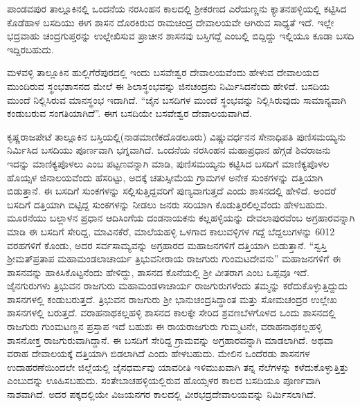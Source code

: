 ಪಾಂಡವಪುರ ತಾಲ್ಲೂಕಿನಲ್ಲಿ ಒಂದನೆಯ ನರಸಿಂಹನ ಕಾಲದಲ್ಲಿ ಶ‍್ರೀಕರಣದ ಎರೆಯಣ್ಣನು ಕ್ಯಾತನಹಳ್ಳಿಯಲ್ಲಿ ಕಟ್ಟಿಸಿದ ಕೊಡೆಹಾಳ ಬಸದಿಯು ಈಗ ಶಾಸನ ದೊರಕಿರುವ ರಾಮಚಂದ್ರ ದೇವಾಲಯವೇ ಆಗಿರುವ ಸಾಧ್ಯತೆ ಇದೆ. ಇಲ್ಲೇ ಭದ್ರವಾಹು ಚಂದ್ರಗುಪ್ತರನ್ನು ಉಲ್ಲೇಖಿಸುವ ಪ್ರಾಚೀನ ಶಾಸನವು ಬಸ್ತಿಗದ್ದೆ ಎಂಬಲ್ಲಿ ಬಿದ್ದಿದ್ದು ಇಲ್ಲಿಯೂ ಕೂಡಾ ಬಸದಿ ಇದ್ದಿರಬಹುದು.

ಮಳವಳ್ಳಿ ತಾಲ್ಲೂಕಿನ ಹುಲ್ಲಿಗೆರೆಪುರದಲ್ಲಿ ಇಂದು ಬಸವೇಶ್ವರ ದೇವಾಲಯವೆಂದು ಹೇಳುವ ದೇವಾಲಯದ ಮುಂದಿರುವ ಸ್ಥಂಭಶಾಸನದ ಮೇಲೆ ಈ ಶಿಲಾಸ್ಥಂಭವನ್ನು ಜಿನಚಂದ್ರನು ನಿರ್ಮಿಸಿದನೆಂದು ಹೇಳಿದೆ. ಬಸದಿಯ ಮುಂದೆ ನಿಲ್ಲಿಸಿರುವ ಮಾನಸ್ಥಂಭ ಇದಾಗಿದೆ. “ಜೈನ ಬಸದಿಗಳ ಮುಂದೆ ಸ್ಥಂಭವನ್ನು ನಿಲ್ಲಿಸಿರುವುದು ಸಾಮಾನ್ಯವಾಗಿ ಕಂಡುಬರುವ ಸಂಗತಿಯಾಗಿದೆ”. ಈಗ ಬಸದಿಯೇ ಬಸವೇಶ್ವರ ದೇವಾಲಯವಾಗಿದೆ.

ಕೃಷ್ಣರಾಜಪೇಟೆ ತಾಲ್ಲೂಕಿನ ಬಸ್ತಿಯಲ್ಲಿ(ನಾಡಮಾಣಿಕದೊಡಲೂರು) ವಿಷ್ಣುವರ್ಧನನ ಸೇನಾಧಿಪತಿ ಪುಣಿಸಮಯ್ಯನು ನಿರ್ಮಿಸಿದ ಬಸದಿಯು ಪೂರ್ಣವಾಗಿ ಭಗ್ನವಾಗಿದೆ. ಒಂದನೆಯ ನರಸಿಂಹನ ಮಹಾಪ್ರಧಾನ ಹೆಗ್ಗಡೆ ಶಿವರಾಜನು ಇದನ್ನು ಮಾಣಿಕ್ಯಪೊಳಲು ಎಂಬ ಪಟ್ಟಣವನ್ನಾಗಿ ಮಾಡಿ, ಪುಣಿಸಮಯ್ಯನು ಕಟ್ಟಿಸಿದ ಬಸದಿಗೆ ಮಾಣಿಕ್ಯಪೊಳಲ ಹೊಯ್ಸಳ ಜಿನಾಲಯವೆಂದು ಹೆಸರಿಟ್ಟು, ಅದಕ್ಕೆ ಚತುಸ್ಸೀಮೆಯ ಗ್ರಾಮಗಳ ಅನೇಕ ಸುಂಕಗಳನ್ನು ದತ್ತಿಯಾಗಿ ಬಿಡುತ್ತಾನೆ. ಈ ಬಸದಿಗೆ ಸುಂಕಗಳನ್ನು ಸಲ್ಲಿಸುತ್ತಿದ್ದವರಿಗೆ ಪುಣ್ಯವಾಗುತ್ತದೆ ಎಂದು ಶಾಸನದಲ್ಲಿ ಹೇಳಿದೆ. ಅಂದರೆ ಬಸದಿಗೆ ದತ್ತಿಯಾಗಿ ಬಿಟ್ಟಿದ್ದ ಸುಂಕಗಳನ್ನು ನೀಡಲು ಜನರು ಸರಿಯಾಗಿ ಕೊಡುತ್ತಿರಲಿಲ್ಲವೆಂದು ಹೇಳಬಹುದು. ಮೂರನೆಯು ಬಲ್ಲಾಳನ ಪ್ರಧಾನ ಆದಿಸಿಂಗೆಯ ದಂಡನಾಯಕನು ಕಲ್ಲಹಳ್ಳಿಯನ್ನು ದೇವಲಾಪುರವೆಂಬ ಅಗ್ರಹಾರವನ್ನಾಗಿ ಮಾಡಿ ಈ ಬಸದಿಗೆ ಸೇರಿದ್ದ, ಮಾವಿನಕೆರೆ, ಮಾಲೆಯಹಳ್ಳಿ ಒಳಗಾದ ಕಾಲುವಳ್ಳಿಗಳ ಗದ್ದೆ ಬೆದ್ದಲುಗಳನ್ನು 6012 ವರಹಗಳಿಗೆ ಕೊಂಡು, ಅದರ ಸರ್ವಸಾಮ್ಯವನ್ನು ಅಗ್ರಹಾರದ ಮಹಾಜನಗಳಿಗೆ ದತ್ತಿಯಾಗಿ ಬಿಡುತ್ತಾನೆ. “ಸ್ವಸ್ತಿ ಶ‍್ರೀಮತ್​ ಪ್ರತಾಪ ಮಹಾಮಂಡಲಾಚಾರ್ಯ ತ್ರಿಭುವನೀರಾಯ ರಾಜಗುರು ಗುಂಮಟದೇವನು” ಮಹಾಜನಗಳಿಗೆ ಈ ಶಾಸನವನ್ನು ಹಾಕಿಸಿಕೊಟ್ಟನೆಂದು ಹೇಳಿದ್ದು, ಶಾಸನದ ಕೊನೆಯಲ್ಲಿ ಶ‍್ರೀ ವೀತರಾಗ ಎಂಬ ಒಪ್ಪವೂ ಇದೆ. ಜೈನಗುರುಗಳು ತ್ರಿಭುವನ ರಾಜಗುರು ಮಹಾಮಂಡಳಾಚಾರ್ಯ ರಾಜಗುರುಗಳೆಂದು ತಮ್ಮನ್ನು ಕರೆದುಕೊಳ್ಳುತ್ತಿದ್ದುದು ಶಾಸನಗಳಲ್ಲಿ ಕಂಡುಬರುತ್ತದೆ. ತ್ರಿಭುವನ ರಾಜಗುರು ಶ‍್ರೀ ಭಾನುಚಂದ್ರಸಿದ್ಧಾಂತ ಮತ್ತು ಸೋಮಚಂದ್ರರ ಉಲ್ಲೇಖ ಶಾಸನಗಳಲ್ಲಿ ಬರುತ್ತದೆ. ವರಾಹನಾಥಕಲ್ಲಹಳ್ಳಿ ಶಾಸನದ ಕಾಲಕ್ಕೇ ಸೇರಿದ ಶ್ರವಣಬೆಳಗೊಳದ ಒಂದು ಶಾಸನದಲ್ಲಿ ರಾಜಗುರು ಗುಂಮಟಣ್ಣನ ಪ್ರಸ್ತಾಪ ಇದೆ ಬಹುಶಃ ಈ ರಾಯರಾಜಗುರು ಗುಮ್ಮಟನೇ, ವರಾಹನಾಥಕಲ್ಲಹಳ್ಳಿ ಶಾಸನೋಕ್ತ ರಾಜಗುರುವಾಗಿದ್ದಾನೆ. ಈ ಬಸದಿಗೆ ಸೇರಿದ್ದ ಗ್ರಾಮವನ್ನು ಅಗ್ರಹಾರವನ್ನಾಗಿ ಮಾಡಲಾಗಿದೆ. ಅಥವಾ ವರಾಹ ದೇವಾಲಯಕ್ಕೆ ದತ್ತಿಯಾಗಿ ಬಿಡಲಾಗಿದೆ ಎಂದು ಹೇಳಬಹುದು. ಮೇಲಿನ ಒಂದೆರಡು ಶಾಸನಗಳ ಉದಾಹರಣೆಯಿಂದಲೇ ಜಿಲ್ಲೆಯಲ್ಲಿ ಜೈನಧರ್ಮವು ಯಾವರೀತಿ ಇಳಿಮುಖವಾಗಿ ತನ್ನ ನೆಲೆಗಳನ್ನು ಕಳೆದುಕೊಳ್ಳುತ್ತಿತ್ತು ಎಂಬುದನ್ನು ಊಹಿಸಬಹುದು. ಸಂತೇಬಾಚಹಳ್ಳಿಯಲ್ಲಿರುವ ಹೊಯ್ಸಳರ ಕಾಲದ ಬಸದಿಯೂ ಪೂರ್ಣವಾಗಿ ನಾಶವಾಗಿದೆ. ಅದರ ಪಕ್ಕದಲ್ಲಿಯೇ ವಿಜಯನಗರ ಕಾಲದಲ್ಲಿ ವೀರಭದ್ರದೇವಾಲಯವನ್ನು ನಿರ್ಮಿಸಲಾಗಿದೆ.


